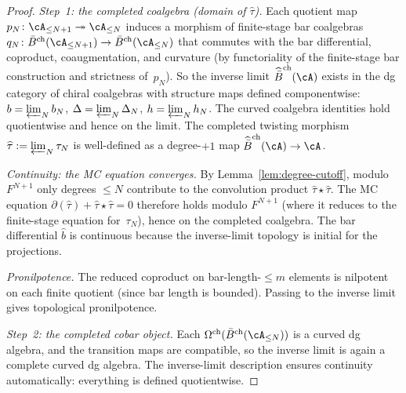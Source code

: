 \begin{proof}
\emph{Step~1: the completed coalgebra
 \textup{(}domain of $\widehat\tau$\textup{)}.}
Each quotient map $p_N\colon \cA_{\le N+1} \twoheadrightarrow
\cA_{\le N}$ induces a morphism of finite-stage bar coalgebras
$q_N\colon \bar B^{\mathrm{ch}}(\cA_{\le N+1}) \to
\bar B^{\mathrm{ch}}(\cA_{\le N})$ that commutes with the bar
differential, coproduct, coaugmentation, and curvature (by functoriality
of the finite-stage bar construction and strictness of~$p_N$). So the
inverse limit $\widehat{\bar B}^{\mathrm{ch}}(\cA)$ exists in the dg
category of chiral coalgebras with structure maps defined componentwise:
$b = \varprojlim_N b_N$, $\Delta = \varprojlim_N \Delta_N$,
$h = \varprojlim_N h_N$. The curved coalgebra identities hold
quotientwise and hence on the limit. The completed twisting morphism
$\widehat\tau := \varprojlim_N \tau_N$ is well-defined as a
degree-$+1$ map $\widehat{\bar B}^{\mathrm{ch}}(\cA) \to \cA$.

\emph{Continuity: the MC equation converges.}
By Lemma~\ref{lem:degree-cutoff}, modulo $F^{N+1}$ only degrees
$\le N$ contribute to the convolution product $\widehat\tau \star
\widehat\tau$. The MC equation
$\partial(\widehat\tau) + \widehat\tau \star \widehat\tau = 0$
therefore holds modulo $F^{N+1}$ (where it reduces to the
finite-stage equation for~$\tau_N$), hence on the completed
coalgebra. The bar differential $\widehat{b}$ is continuous
because the inverse-limit topology is initial for the projections.

\emph{Pronilpotence.}
The reduced coproduct on bar-length-$\le m$ elements is nilpotent on each finite
quotient (since bar length is bounded). Passing to the inverse limit
gives topological pronilpotence.

\emph{Step~2: the completed cobar object.}
Each $\Omega^{\mathrm{ch}}(\bar B^{\mathrm{ch}}(\cA_{\le N}))$ is a
curved dg algebra, and the transition maps are compatible, so the
inverse limit is again a complete curved dg algebra. The
inverse-limit description ensures continuity automatically: everything
is defined quotientwise.


\end{proof}
